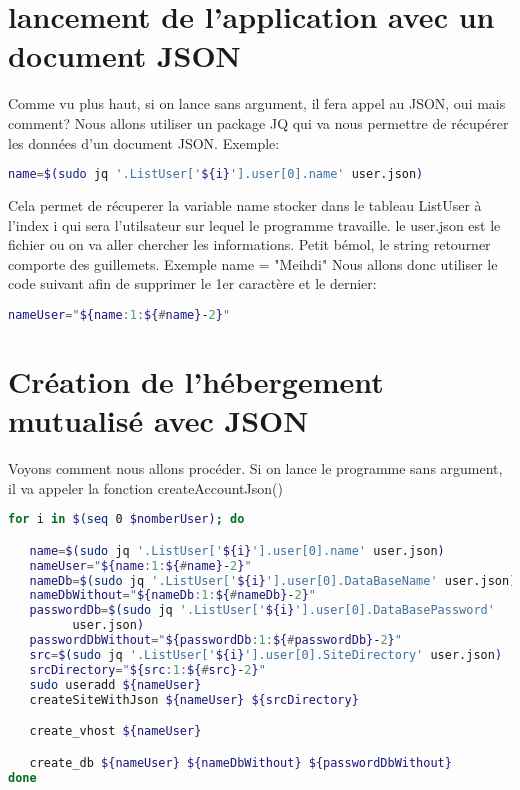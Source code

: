 \documentclass{article}
\begin{document}
	
\section{lancement de l'application avec un document JSON}

	Comme vu plus haut, si on lance sans argument, il fera appel au JSON, oui mais comment?
	Nous allons utiliser un package JQ qui va nous permettre de récupérer les données d'un document JSON. 
	Exemple:
	
	\begin{lstlisting}[language=bash]
	name=$(sudo jq '.ListUser['${i}'].user[0].name' user.json)
	\end{lstlisting}

	Cela  permet de récuperer la variable name stocker dans le tableau ListUser à l'index i qui sera l'utilsateur sur lequel le programme travaille.
	le user.json est le fichier ou on va aller chercher les informations. Petit bémol, le string retourner comporte des guillemets. Exemple name = "Meihdi"
	Nous allons donc utiliser le code suivant afin de supprimer le 1er caractère et le dernier: 
	\begin{lstlisting}[language=bash]
	nameUser="${name:1:${#name}-2}"
	\end{lstlisting}

	
\section{Création de l'hébergement mutualisé avec JSON}

	Voyons comment nous allons procéder. Si on lance le programme sans argument, il va appeler la fonction createAccountJson() 

\begin{lstlisting}[language=bash]
for i in $(seq 0 $nomberUser); do

   name=$(sudo jq '.ListUser['${i}'].user[0].name' user.json)
   nameUser="${name:1:${#name}-2}"
   nameDb=$(sudo jq '.ListUser['${i}'].user[0].DataBaseName' user.json)
   nameDbWithout="${nameDb:1:${#nameDb}-2}"
   passwordDb=$(sudo jq '.ListUser['${i}'].user[0].DataBasePassword'
   		 user.json)
   passwordDbWithout="${passwordDb:1:${#passwordDb}-2}"
   src=$(sudo jq '.ListUser['${i}'].user[0].SiteDirectory' user.json)
   srcDirectory="${src:1:${#src}-2}"
   sudo useradd ${nameUser}
   createSiteWithJson ${nameUser} ${srcDirectory}

   create_vhost ${nameUser}

   create_db ${nameUser} ${nameDbWithout} ${passwordDbWithout}
done
	\end{lstlisting}
\end{document}
